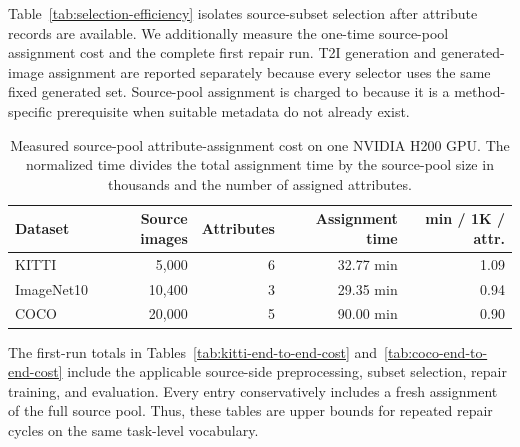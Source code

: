 Table~\ref{tab:selection-efficiency} isolates source-subset selection after attribute records are available. We additionally measure the one-time source-pool assignment cost and the complete first repair run. T2I generation and generated-image assignment are reported separately because every selector uses the same fixed generated set. Source-pool assignment is charged to \model because it is a method-specific prerequisite when suitable metadata do not already exist.

\begin{table}[h]
\centering
\caption{Measured source-pool attribute-assignment cost on one NVIDIA H200 GPU. The normalized time divides the total assignment time by the source-pool size in thousands and the number of assigned attributes.}
\label{tab:source-assignment-cost}
\small
\setlength{\tabcolsep}{4pt}
\begin{tabular}{l r r r r}
\toprule
\rowcolor{sectiongray} \textbf{Dataset} & \textbf{Source images} & \textbf{Attributes} & \textbf{Assignment time} & \textbf{min / 1K / attr.} \\
\midrule
KITTI & 5,000 & 6 & 32.77 min & 1.09 \\
ImageNet10 & 10,400 & 3 & 29.35 min & 0.94 \\
COCO & 20,000 & 5 & 90.00 min & 0.90 \\
\bottomrule
\end{tabular}
\end{table}

The first-run totals in Tables~\ref{tab:kitti-end-to-end-cost} and~\ref{tab:coco-end-to-end-cost} include the applicable source-side preprocessing, subset selection, repair training, and evaluation. Every \model entry conservatively includes a fresh assignment of the full source pool. Thus, these tables are upper bounds for repeated repair cycles on the same task-level vocabulary.

